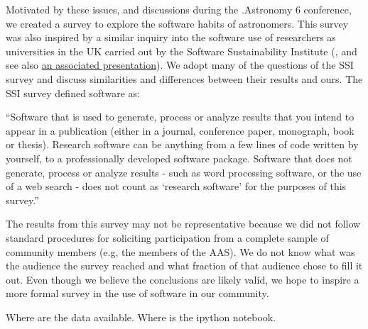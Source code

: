 Motivated by these issues, and discussions during the .Astronomy 6 conference, we created a survey to explore the software habits of astronomers. 
This survey was also inspired by a similar inquiry into the software use of researchers as universities in the UK carried out by the Software Sustainability Institute (\citealt{f824cd98-b953-4c08-96c8-2533188bc4c4}, and see also \href{http://wl.figshare.com/articles/1243288/embed?show_title=1}{an associated presentation}). We adopt many of the questions of the SSI survey and discuss similarities and differences between their results and ours. The SSI survey defined software as:

“Software that is used to generate, process or analyze results that you intend to appear in a publication (either in a journal, conference paper, monograph, book or thesis). Research software can be anything from a few lines of code written by yourself, to a professionally developed software package. Software that does not generate, process or analyze results - such as word processing software, or the use of a web search - does not count as ‘research software’ for the purposes of this survey.”

The results from this survey may not be representative because we did not follow standard procedures for soliciting participation from a complete sample of community members (e.g, the members of the AAS). We do not know what was the audience the survey reached and what fraction of that audience chose to fill it out. Even though we believe the conclusions are likely valid, we hope to inspire a more formal survey in the use of software in our community.

Where are the data available. Where is the ipython notebook.